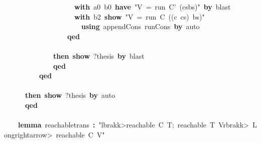 \documentclass{article}
\newcommand{\syntaxKEYWORDA}[1]{\textcolor[rgb]{0.0,0.4,0.6}{\textbf{#1}}}
\newcommand{\syntaxKEYWORDC}[1]{\textcolor[rgb]{0.0,0.6,1.0}{\textbf{#1}}}
\newcommand{\syntaxLITERALA}[1]{\textcolor[rgb]{1.0,0.0,0.8}{#1}}
\newcommand{\syntaxOPERATOR}[1]{\textcolor[rgb]{0.0,0.0,0.0}{\textbf{#1}}}
\newcommand{\syntaxKEYWORDA}[1]{\textcolor[rgb]{0.0,0.4,0.6}{\textbf{#1}}}
\newcommand{\syntaxKEYWORDC}[1]{\textcolor[rgb]{0.0,0.6,1.0}{\textbf{#1}}}
\newcommand{\syntaxLITERALA}[1]{\textcolor[rgb]{1.0,0.0,0.8}{#1}}
\newcommand{\syntaxOPERATOR}[1]{\textcolor[rgb]{0.0,0.0,0.0}{\textbf{#1}}}
\newcommand{\syntaxKEYWORDA}[1]{\textcolor[rgb]{0.0,0.4,0.6}{\textbf{#1}}}
\newcommand{\syntaxKEYWORDC}[1]{\textcolor[rgb]{0.0,0.6,1.0}{\textbf{#1}}}
\newcommand{\syntaxLITERALA}[1]{\textcolor[rgb]{1.0,0.0,0.8}{#1}}
\newcommand{\syntaxOPERATOR}[1]{\textcolor[rgb]{0.0,0.0,0.0}{\textbf{#1}}}
\newcommand{\syntaxKEYWORDA}[1]{\textcolor[rgb]{0.0,0.4,0.6}{#1}}
\newcommand{\syntaxKEYWORDC}[1]{\textcolor[rgb]{0.0,0.6,1.0}{#1}}
\newcommand{\syntaxLITERALA}[1]{\textcolor[rgb]{1.0,0.0,0.8}{\textbf{#1}}}
\newcommand{\syntaxOPERATOR}[1]{\textcolor[rgb]{0.0,0.0,0.0}{#1}}
\newcommand{\syntaxKEYWORDA}[1]{\textcolor[rgb]{0.0,0.4,0.6}{\textbf{#1}}}
\newcommand{\syntaxKEYWORDC}[1]{\textcolor[rgb]{0.0,0.6,1.0}{\textbf{#1}}}
\newcommand{\syntaxLITERALA}[1]{\textcolor[rgb]{1.0,0.0,0.8}{#1}}
\newcommand{\syntaxOPERATOR}[1]{\textcolor[rgb]{0.0,0.0,0.0}{\textbf{#1}}}
\newcommand{\syntaxKEYWORDA}[1]{\textcolor[rgb]{0.0,0.4,0.6}{\textbf{#1}}}
\newcommand{\syntaxKEYWORDC}[1]{\textcolor[rgb]{0.0,0.6,1.0}{\textbf{#1}}}
\newcommand{\syntaxLITERALA}[1]{\textcolor[rgb]{1.0,0.0,0.8}{#1}}
\newcommand{\syntaxOPERATOR}[1]{\textcolor[rgb]{0.0,0.0,0.0}{\textbf{#1}}}
\begin{document}
{\ }{\ }{\ }{\ }{\ }{\ }{\ }{\ }{\ }{\ }{\ }{\ }{\ }{\ }{\ }{\ }{\ }{\ }{\ }{\ }\syntaxKEYWORDA{with}{\ }a0{\ }b0{\ }\syntaxKEYWORDA{have}{\ }\syntaxLITERALA{"V{\ }={\ }run{\ }C'{\ }(cs\usebox{\atbox}bs)"}{\ }\syntaxKEYWORDA{by}{\ }blast\hspace*{\fill}\\
{\ }{\ }{\ }{\ }{\ }{\ }{\ }{\ }{\ }{\ }{\ }{\ }{\ }{\ }{\ }{\ }{\ }{\ }{\ }{\ }\syntaxKEYWORDA{with}{\ }b2{\ }\syntaxKEYWORDC{show}{\ }\syntaxLITERALA{"V{\ }={\ }run{\ }C{\ }((c{\ }\usebox{\hashbox}{\ }cs){\ }\usebox{\atbox}{\ }bs)"}\hspace*{\fill}\\
{\ }{\ }{\ }{\ }{\ }{\ }{\ }{\ }{\ }{\ }{\ }{\ }{\ }{\ }{\ }{\ }{\ }{\ }{\ }{\ }{\ }{\ }\syntaxKEYWORDA{using}{\ }append\usebox{\underscorebox}Cons{\ }run\usebox{\underscorebox}Cons{\ }\syntaxKEYWORDA{by}{\ }auto{\ }\hspace*{\fill}\\
{\ }{\ }{\ }{\ }{\ }{\ }{\ }{\ }{\ }{\ }{\ }{\ }{\ }{\ }{\ }{\ }{\ }{\ }\syntaxKEYWORDA{qed}\hspace*{\fill}\\
{\ }{\ }{\ }{\ }{\ }{\ }{\ }{\ }{\ }{\ }{\ }{\ }{\ }{\ }\syntaxKEYWORDA{\usebox{\closecurlybracket}}\hspace*{\fill}\\
{\ }{\ }{\ }{\ }{\ }{\ }{\ }{\ }{\ }{\ }{\ }{\ }{\ }{\ }\syntaxKEYWORDA{then}{\ }\syntaxKEYWORDC{show}{\ }?thesis{\ }\syntaxKEYWORDA{by}{\ }blast\hspace*{\fill}\\
{\ }{\ }{\ }{\ }{\ }{\ }{\ }{\ }{\ }{\ }{\ }{\ }{\ }{\ }\syntaxKEYWORDA{qed}\hspace*{\fill}\\
{\ }{\ }{\ }{\ }{\ }{\ }{\ }{\ }{\ }{\ }\syntaxKEYWORDA{qed}\hspace*{\fill}\\
{\ }{\ }{\ }{\ }{\ }{\ }\syntaxKEYWORDA{\usebox{\closecurlybracket}}\hspace*{\fill}\\
{\ }{\ }{\ }{\ }{\ }{\ }\syntaxKEYWORDA{then}{\ }\syntaxKEYWORDC{show}{\ }?thesis{\ }\syntaxKEYWORDA{by}{\ }auto\hspace*{\fill}\\
{\ }{\ }{\ }{\ }{\ }{\ }\syntaxKEYWORDA{qed}\hspace*{\fill}\\
\hspace*{\fill}\\
{\ }{\ }{\ }{\ }\syntaxKEYWORDA{lemma}{\ }reachable\usebox{\underscorebox}trans{\ }\syntaxOPERATOR{:}{\ }\syntaxLITERALA{"\<lbrakk>reachable{\ }C{\ }T;{\ }reachable{\ }T{\ }V\<rbrakk>{\ }\<Longrightarrow>{\ }reachable{\ }C{\ }V"}\hspace*{\fill}\\
\end{document}
